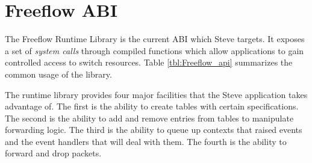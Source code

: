 

\section{Freeflow ABI} \label{fp:dp_interface}

The Freeflow Runtime Library is the current ABI which Steve targets. It exposes a set of \emph{system calls} through compiled functions which allow applications to gain controlled access to switch resources. Table \ref{tbl:Freeflow_api} summarizes the common usage of the library.

The runtime library provides four major facilities that the Steve application takes advantage of. The first is the ability to create tables with certain specifications. The second is the ability to add and remove entries from tables to manipulate forwarding logic. The third is the ability to queue up contexts that raised events and the event handlers that will deal with them. The fourth is the ability to forward and drop packets.

